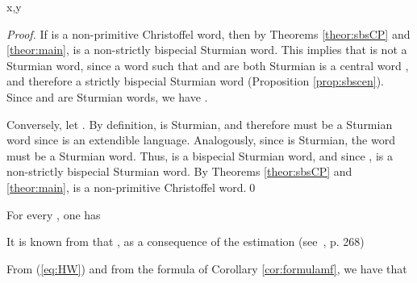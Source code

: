 \documentclass{llncs}
\begin{document}
\begin{theorem}\label{theor:mf}
 x,y\in \Sigma
\end{theorem}

\begin{proof}
If  is a non-primitive Christoffel word, then by Theorems \ref{theor:sbsCP} and  \ref{theor:main},  is a non-strictly bispecial Sturmian word. This implies that  is not a Sturmian word, since a word  such that  and  are both Sturmian is a central word \cite{DelMi94}, and therefore a strictly bispecial Sturmian word (Proposition \ref{prop:sbscen}). Since  and  are Sturmian words, we have .

Conversely, let . By definition,  is Sturmian, and therefore  must be a  Sturmian word since  is an extendible language. Analogously, since  is Sturmian, the word  must be a Sturmian word. Thus,  is a bispecial Sturmian word, and since ,  is a  non-strictly bispecial Sturmian word. By Theorems \ref{theor:sbsCP} and \ref{theor:main},  is a non-primitive Christoffel word.\qed
\end{proof}

\begin{corollary}\label{cor:formulamf}
 For every , one has 
\end{corollary}

It is known from \cite{Mig91} that , as a consequence of the estimation (see~\cite{HaWr}, p. 268)

From (\ref{eq:HW}) and from the formula of Corollary \ref{cor:formulamf}, we have that 




\end{document}
